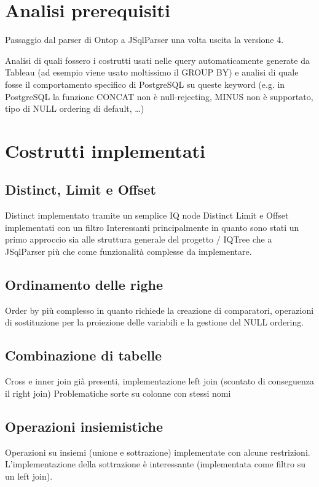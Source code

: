 \section{Analisi prerequisiti}
\label{sec:prerequisits}
Passaggio dal parser di Ontop a JSqlParser una volta uscita la versione 4.

Analisi di quali fossero i costrutti usati nelle query automaticamente generate da Tableau (ad esempio viene usato moltissimo il GROUP BY) e analisi di quale fosse il comportamento specifico di PostgreSQL su queste keyword
(e.g. in PostgreSQL la funzione CONCAT non è null-rejecting, MINUS non è supportato, tipo di NULL ordering di default, \dots)

\section{Costrutti implementati}
\label{sec:implementation}

\subsection{Distinct, Limit e Offset}
Distinct implementato tramite un semplice IQ node Distinct
Limit e Offset implementati con un filtro
Interessanti principalmente in quanto sono stati un primo approccio sia alle struttura generale del progetto / IQTree che a JSqlParser più che come funzionalità complesse da implementare.

\subsection{Ordinamento delle righe}
Order by più complesso in quanto richiede la creazione di comparatori, operazioni di sostituzione per la proiezione delle variabili 
e la gestione del NULL ordering.

\subsection{Combinazione di tabelle}
Cross e inner join già presenti, implementazione left join (scontato di conseguenza il right join) 
Problematiche sorte su colonne con stessi nomi

\subsection{Operazioni insiemistiche}
Operazioni su insiemi (unione e sottrazione) implementate con alcune restrizioni.
L'implementazione della sottrazione è interessante (implementata come filtro su un left join).

